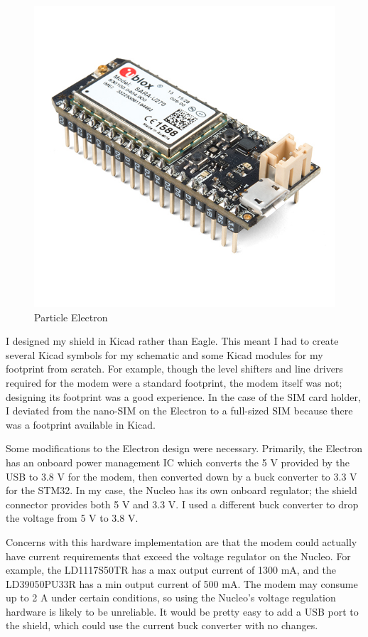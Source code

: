 \documentclass{article}
\begin{document}
\begin{figure}[h]
  \centering
  \includegraphics[scale=0.3]{particle_electron}
  \caption{Particle Electron} \label{fig:electron}
\end{figure}

I designed my shield in Kicad rather than Eagle. This meant I had to create several Kicad symbols for my schematic and some Kicad modules for my footprint from scratch. For example, though the level shifters and line drivers required for the modem were a standard footprint, the modem itself was not; designing its footprint was a good experience. In the case of the SIM card holder, I deviated from the nano-SIM on the Electron to a full-sized SIM because there was a footprint available in Kicad.

Some modifications to the Electron design were necessary. Primarily, the Electron has an onboard power management IC which converts the 5 V provided by the USB to 3.8 V for the modem, then converted down by a buck converter to 3.3 V for the STM32. In my case, the Nucleo has its own onboard regulator; the shield connector provides both 5 V and 3.3 V. I used a different buck converter to drop the voltage from 5 V to 3.8 V.

Concerns with this hardware implementation are that the modem could actually have current requirements that exceed the voltage regulator on the Nucleo. For example, the LD1117S50TR has a max output current of 1300 mA, and the LD39050PU33R has a min output current of 500 mA. The modem may consume up to 2 A under certain conditions, so using the Nucleo's voltage regulation hardware is likely to be unreliable. It would be pretty easy to add a USB port to the shield, which could use the current buck converter with no changes.
\end{document}
